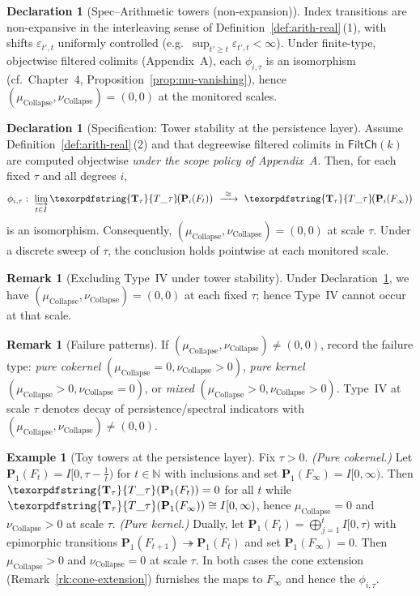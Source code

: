 \documentclass[11pt]{article}
\numberwithin{equation}{section}
\theoremstyle{plain}
\theoremstyle{definition}
\theoremstyle{remark}
\DeclareRobustCommand{\hyp}{\nobreakdash-}
\theoremstyle{plain}
\theoremstyle{definition}
\numberwithin{equation}{section}
\theoremstyle{definition}
\newtheorem{example}[theorem]{Example}
\newtheorem{remark}[theorem]{Remark}
\newtheorem{declaration}[theorem]{Declaration}
\DeclareRobustCommand{\FiltCh}[1]{\mathsf{FiltCh}(#1)}
\DeclareRobustCommand{\Ttau}{\texorpdfstring{\ensuremath{\mathbf{T}_{\tau}}}{T\_\tau}}
\DeclareRobustCommand{\muc}{\mu_{\mathrm{Collapse}}}
\DeclareRobustCommand{\nuc}{\nu_{\mathrm{Collapse}}}
\numberwithin{equation}{section}
\theoremstyle{plain}
\theoremstyle{definition}
\theoremstyle{remark}
\providecommand{\Tfun}[1]{\mathbf{T}_{#1}}
\providecommand{\Ttau}{\Tfun{\tau}}
\providecommand{\muc}{\mu_{\mathrm{Collapse}}}
\providecommand{\nuc}{\nu_{\mathrm{Collapse}}}
\begin{document}
\begin{declaration}[Spec–Arithmetic towers (non\hyp expansion)]\label{spec:arith-nonexp}
Index transitions are non\hyp expansive in the interleaving sense of Definition~\ref{def:arith-real}\,(1), with shifts \(\varepsilon_{t',t}\) uniformly controlled (e.g.\ \(\sup_{t'\ge t}\varepsilon_{t',t}<\infty\)).
Under finite\hyp type, objectwise filtered colimits (Appendix~A), each \(\phi_{i,\tau}\) is an isomorphism (cf.\ Chapter~4, Proposition~\ref{prop:mu-vanishing}), hence \((\muc,\nuc)=(0,0)\) at the monitored scales.
\end{declaration}

\begin{declaration}[Specification: Tower stability at the persistence layer]\label{spec:tower-stability}
Assume Definition~\ref{def:arith-real}\,(2) and that degreewise filtered colimits in \(\FiltCh{k}\) are computed objectwise \emph{under the scope policy of Appendix~A}.
Then, for each fixed \(\tau\) and all degrees \(i\),
\[
  \phi_{i,\tau}:\ \varinjlim_{t\in I} \Ttau\!\big(\mathbf{P}_i(F_t)\big)\ \xrightarrow{\ \cong\ }\ \Ttau\!\big(\mathbf{P}_i(F_\infty)\big)
\]
is an isomorphism. Consequently, \((\muc,\nuc)=(0,0)\) at scale \(\tau\).
Under a discrete sweep of \(\tau\), the conclusion holds pointwise at each monitored scale.
\end{declaration}

\begin{remark}[Excluding Type~IV under tower stability]\label{rk:exclude-typeIV}
Under Declaration~\ref{spec:tower-stability}, we have \((\muc,\nuc)=(0,0)\) at each fixed \(\tau\); hence Type~IV cannot occur at that scale.
\end{remark}

\begin{remark}[Failure patterns]\label{rk:fail}
If \((\muc,\nuc)\neq(0,0)\), record the failure type: \emph{pure cokernel} \((\muc=0,\nuc>0)\), \emph{pure kernel} \((\muc>0,\nuc=0)\), or \emph{mixed} \((\muc>0,\nuc>0)\).
Type~IV at scale \(\tau\) denotes decay of persistence/spectral indicators with \((\muc,\nuc)\neq(0,0)\).
\end{remark}

\begin{example}[Toy towers at the persistence layer]\label{ex:toy-towers}
Fix \(\tau>0\).
\emph{(Pure cokernel.)} Let \(\mathbf{P}_1(F_t)=I[0,\tau-\tfrac{1}{t})\) for $t\in\mathbb{N}$ with inclusions and set \(\mathbf{P}_1(F_\infty)=I[0,\infty)\).
Then \(\Ttau(\mathbf{P}_1(F_t))=0\) for all $t$ while \(\Ttau(\mathbf{P}_1(F_\infty))\cong I[0,\infty)\), hence \(\muc=0\) and \(\nuc>0\) at scale \(\tau\).
\emph{(Pure kernel.)} Dually, let \(\mathbf{P}_1(F_t)=\bigoplus_{j=1}^{t} I[0,\tau)\) with epimorphic transitions \(\mathbf{P}_1(F_{t+1})\twoheadrightarrow \mathbf{P}_1(F_t)\) and set \(\mathbf{P}_1(F_\infty)=0\).
Then \(\muc>0\) and \(\nuc=0\) at scale \(\tau\).
In both cases the cone extension (Remark~\ref{rk:cone-extension}) furnishes the maps to \(F_\infty\) and hence the \(\phi_{i,\tau}\).
\end{example}
\end{document}
